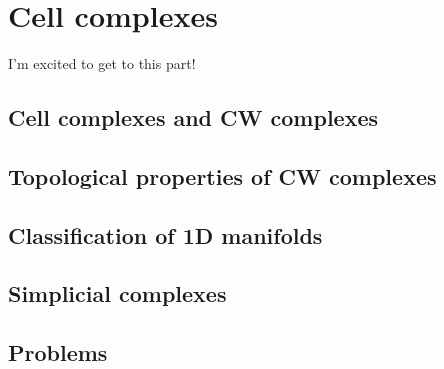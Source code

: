 \chapter{Cell complexes}
I'm excited to get to this part!

\section{Cell complexes and CW complexes}
\section{Topological properties of CW complexes}
\section{Classification of 1D manifolds}
\section{Simplicial complexes}
\section{Problems}

